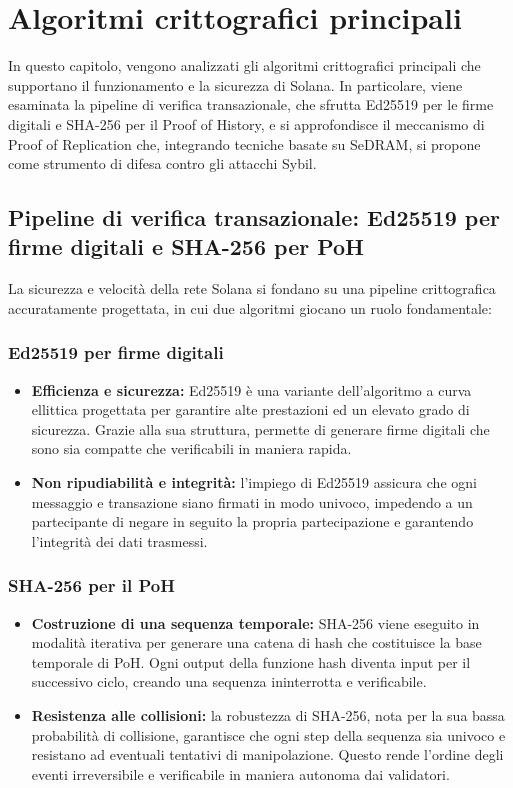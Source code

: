 \documentclass[a4paper,12pt]{report}
\begin{document}
	\chapter{Algoritmi crittografici principali}
	In questo capitolo, vengono analizzati gli algoritmi crittografici principali che supportano il funzionamento e la sicurezza di Solana. In particolare, viene esaminata la pipeline di verifica transazionale, che sfrutta Ed25519 per le firme digitali e SHA-256 per il Proof of History, e si approfondisce il meccanismo di Proof of Replication che, integrando tecniche basate su SeDRAM, si propone come strumento di difesa contro gli attacchi Sybil.
	
	\section{Pipeline di verifica transazionale: Ed25519 per firme digitali e SHA-256 per PoH}
	La sicurezza e velocità della rete Solana si fondano su una pipeline crittografica accuratamente progettata, in cui due algoritmi giocano un ruolo fondamentale:
	
	\subsection{Ed25519 per firme digitali}
	\begin{itemize}
		\item \textbf{Efficienza e sicurezza:} Ed25519 è una variante dell'algoritmo a curva ellittica progettata per garantire alte prestazioni ed un elevato grado di sicurezza. Grazie alla sua struttura, permette di generare firme digitali che sono sia compatte che verificabili in maniera rapida.
		\item \textbf{Non ripudiabilità e integrità:} l'impiego di Ed25519 assicura che ogni messaggio e transazione siano firmati in modo univoco, impedendo a un partecipante di negare in seguito la propria partecipazione e garantendo l'integrità dei dati trasmessi.
	\end{itemize}
	
	\subsection{SHA-256 per il PoH}
	\begin{itemize}
		\item \textbf{Costruzione di una sequenza temporale:} SHA-256 viene eseguito in modalità iterativa per generare una catena di hash che costituisce la base temporale di PoH. Ogni output della funzione hash diventa input per il successivo ciclo, creando una sequenza ininterrotta e verificabile.
		\item \textbf{Resistenza alle collisioni:} la robustezza di SHA-256, nota per la sua bassa probabilità di collisione, garantisce che ogni step della sequenza sia univoco e resistano ad eventuali tentativi di manipolazione. Questo rende l'ordine degli eventi irreversibile e verificabile in maniera autonoma dai validatori.
	\end{itemize}
	
\end{document}
